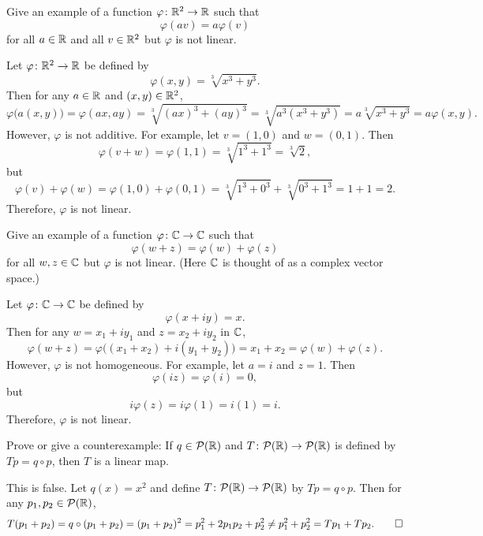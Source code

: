 \begin{exercise}
Give an example of a function $\varphi\colon\mathbb{R}^2\to\mathbb{R}$ such that
\[ \varphi(av)=a\varphi(v) \]
for all $a\in\mathbb{R}$ and all $v\in\mathbb{R}^2$ but $\varphi$ is not linear.
\end{exercise}
\begin{solution}

Let $\varphi\colon\mathbb{R}^2\to\mathbb{R}$ be defined by
\[ \varphi(x,y)=\sqrt[3]{x^3+y^3}. \]
Then for any $a\in\mathbb{R}$ and $(x,y)\in\mathbb{R}^2$,
\[ \varphi\bigl(a(x,y)\bigr)=\varphi(ax,ay)=\sqrt[3]{(ax)^3+(ay)^3}
   =\sqrt[3]{a^3(x^3+y^3)}=a\sqrt[3]{x^3+y^3}=a\varphi(x,y). \]
However, $\varphi$ is not additive. For example, let $v=(1,0)$ and $w=(0,1)$.
Then
\[ \varphi(v+w)=\varphi(1,1)=\sqrt[3]{1^3+1^3}=\sqrt[3]{2}, \]
but
\[ \varphi(v)+\varphi(w)=\varphi(1,0)+\varphi(0,1)
   =\sqrt[3]{1^3+0^3}+\sqrt[3]{0^3+1^3}=1+1=2. \]
Therefore, $\varphi$ is not linear.
\end{solution}

\begin{exercise}
Give an example of a function $\varphi\colon\mathbb{C}\to\mathbb{C}$ such that
\[ \varphi(w+z)=\varphi(w)+\varphi(z) \]
for all $w,z\in\mathbb{C}$ but $\varphi$ is not linear. (Here $\mathbb{C}$ is thought of as a
complex vector space.)
\end{exercise}
\begin{solution}
Let $\varphi\colon\mathbb{C}\to\mathbb{C}$ be defined by
\[ \varphi(x+iy)=x. \]
Then for any $w=x_1+iy_1$ and $z=x_2+iy_2$ in $\mathbb{C}$,
\[ \varphi(w+z)=\varphi\bigl((x_1+x_2)+i(y_1+y_2)\bigr)=x_1+x_2
   =\varphi(w)+\varphi(z). \]
However, $\varphi$ is not homogeneous. For example, let $a=i$ and $z=1$. Then
\[ \varphi(iz)=\varphi(i)=0, \]
but
\[ i\varphi(z)=i\varphi(1)=i(1)=i. \]
Therefore, $\varphi$ is not linear.
\end{solution}

\begin{exercise}
Prove or give a counterexample: If $q\in\mathcal{P}(\mathbb{R})$ and
$T\colon\mathcal{P}(\mathbb{R})\to\mathcal{P}(\mathbb{R})$ is defined by $Tp=q\circ p$, then $T$ is a
linear map.
\end{exercise}
\begin{solution}
This is false. Let $q(x)=x^2$ and define $T\colon\mathcal{P}(\mathbb{R})\to\mathcal{P}(\mathbb{R})$ by
$Tp=q\circ p$. Then for any $p_1,p_2\in\mathcal{P}(\mathbb{R})$,
\[ T(p_1+p_2)=q\circ(p_1+p_2)=(p_1+p_2)^2=p_1^2+2p_1p_2+p_2^2
   \ne p_1^2+p_2^2=Tp_1+Tp_2. \qedhere \]
\end{solution}

